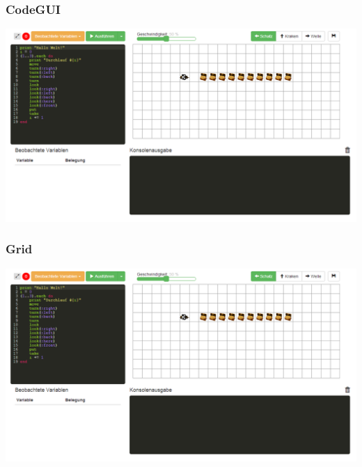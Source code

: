 \begin{frame}
\frametitle{CodeGUI}
\begin{center}
	\includegraphics[scale=0.35]{client/client}
\end{center}
\end{frame}

\begin{frame}
\frametitle{Grid}
\begin{center}
	\includegraphics[scale=0.35]{client/client} %
\end{center}
\end{frame}
